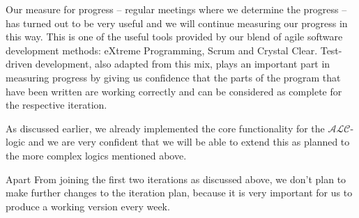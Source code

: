 Our measure for progress -- regular meetings
where we determine the progress -- has turned out to be very useful and we will continue
measuring our progress in this way. This is one of the useful tools provided by our 
blend of agile software development methods: eXtreme Programming, Scrum and Crystal Clear.
Test-driven development, also adapted from this mix, plays an important part in measuring
progress by giving us confidence that the parts of the program that have been written are
working correctly and can be considered as complete for the respective iteration.

As discussed earlier, we already implemented the
core functionality for the $\mathcal{ALC}$-logic and we are very confident that we will
be able to extend this as planned to the more complex logics mentioned above.

Apart From joining the first two
iterations as discussed above, we don't plan to make further changes to the iteration
plan, because it is very important for us to produce a working version every week.